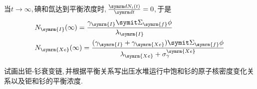 \begin{exercise}
\begin{solution}
        当$t \to \infty$,\,碘和氙达到平衡浓度时,\,$\dv{N_i(t)}{t} = 0$,\,于是
        \begin{align*}
            & N_{\symrm{I}}(\infty) = \frac{\gamma_{\symrm{I}} \vSigma_{\symrm{f}} \phi}{\lambda_{\symrm{I}}} \\
            & N_{\symrm{Xe}}(\infty) = \frac{(\gamma_{\symrm{I}} + \gamma_{\symrm{Xe}}) \vSigma_{\symrm{f}} \phi}{\lambda_{\symrm{Xe}} + \sigma_{\gamma}^{\symrm{Xe}}}
        \end{align*}
    \end{solution}
\end{exercise}

\begin{exercise}
    试画出钜-钐衰变链,\,并根据平衡关系写出压水堆运行中饱和钐的原子核密度变化关系以及钜和钐的平衡浓度.\,
    \begin{solution}


\end{solution}
\end{exercise}
